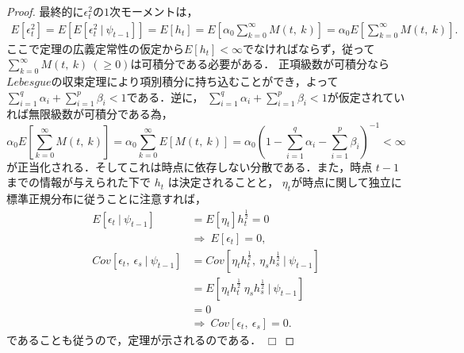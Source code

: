 \documentclass[8pt]{jsarticle}
\newtheorem{proof}{証明}
\def\qed{\hfill $\Box$}
\begin{document}
\begin{proof}
最終的に$\epsilon_t^2$の$1$次モーメントは，
\begin{align*}
	E[\epsilon_t^2] = E\left[ E[\epsilon_t^2\ |\ \psi_{t-1}] \right] = E[h_t]
	= E\left[ \alpha_0 \sum_{k=0}^{\infty} M(t,\ k) \right]
	= \alpha_0 E\left[ \sum_{k=0}^{\infty} M(t,\ k) \right].
\end{align*}
ここで定理の広義定常性の仮定から$E[h_t] < \infty$でなければならず，従って$\sum_{k=0}^{\infty} M(t,\ k)\ (\geq 0)$は可積分である必要がある．
正項級数が可積分なら$Lebesgue$の収束定理により項別積分に持ち込むことができ，よって$\sum_{i=1}^{q} \alpha_i + \sum_{i=1}^{p} \beta_i < 1$である．逆に，
$\sum_{i=1}^{q} \alpha_i + \sum_{i=1}^{p} \beta_i < 1$が仮定されていれば無限級数が可積分である為，
\[
	\alpha_0 E\left[ \sum_{k=0}^{\infty} M(t,\ k) \right] = \alpha_0 \sum_{k=0}^{\infty} E\left[ M(t,\ k) \right] = \alpha_0 \left( 1 - \sum_{i=1}^{q} \alpha_i - \sum_{i=1}^{p} \beta_i \right)^{-1} < \infty
\]
が正当化される．そしてこれは時点に依存しない分散である．また，時点 $t-1$ までの情報が与えられた下で $h_t$ は決定されることと，
$\eta_t$が時点に関して独立に標準正規分布に従うことに注意すれば，
\begin{align*}
	E[\epsilon_t\ |\ \psi_{t-1}] &= E[\eta_t]h_t^\frac{1}{2} = 0\ \\
	&\Rightarrow\ E[\epsilon_t] = 0, \\
	Cov[\epsilon_t,\ \epsilon_s\ |\ \psi_{t-1}] &= Cov[\eta_t h_t^\frac{1}{2},\ \eta_s h_s^\frac{1}{2}\ |\ \psi_{t-1}] \\
	&= E[\eta_t h_t^\frac{1}{2}\ \eta_s h_s^\frac{1}{2}\ |\ \psi_{t-1}] \\
	&= 0 \\
	&\Rightarrow\ Cov[\epsilon_t,\ \epsilon_s] = 0.
\end{align*}
であることも従うので，定理が示されるのである．
\qed
\end{proof}
\end{document}
